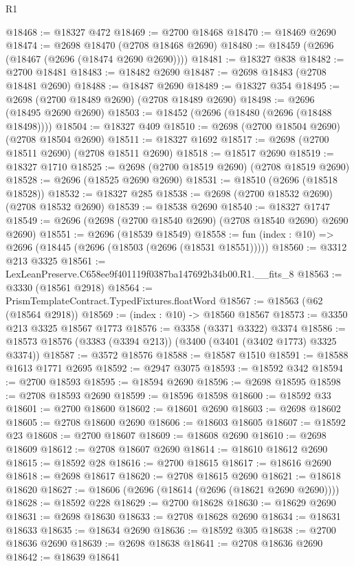 \begin{lexlean}{R1}
\begin{coremodule}
@18468 := @18327 @472
@18469 := @2700 @18468
@18470 := @18469 @2690
@18474 := @2698 @18470 (@2708 @18468 @2690)
@18480 := @18459 (@2696 (@18467 (@2696 (@18474 @2690 @2690))))
@18481 := @18327 @838
@18482 := @2700 @18481
@18483 := @18482 @2690
@18487 := @2698 @18483 (@2708 @18481 @2690)
@18488 := @18487 @2690
@18489 := @18327 @354
@18495 := @2698 (@2700 @18489 @2690) (@2708 @18489 @2690)
@18498 := @2696 (@18495 @2690 @2690)
@18503 := @18452 (@2696 (@18480 (@2696 (@18488 @18498))))
@18504 := @18327 @409
@18510 := @2698 (@2700 @18504 @2690) (@2708 @18504 @2690)
@18511 := @18327 @1692
@18517 := @2698 (@2700 @18511 @2690) (@2708 @18511 @2690)
@18518 := @18517 @2690
@18519 := @18327 @1710
@18525 := @2698 (@2700 @18519 @2690) (@2708 @18519 @2690)
@18528 := @2696 (@18525 @2690 @2690)
@18531 := @18510 (@2696 (@18518 @18528))
@18532 := @18327 @285
@18538 := @2698 (@2700 @18532 @2690) (@2708 @18532 @2690)
@18539 := @18538 @2690
@18540 := @18327 @1747
@18549 := @2696 (@2698 (@2700 @18540 @2690) (@2708 @18540 @2690) @2690 @2690)
@18551 := @2696 (@18539 @18549)
@18558 := fun (index : @10) => @2696 (@18445 (@2696 (@18503 (@2696 (@18531 @18551)))))
@18560 := @3312 @213 @3325
@18561 := LexLeanPreserve.C658ee9f401119f0387ba147692b34b00.R1.__fits_8
@18563 := @3330 (@18561 @2918)
@18564 := PrismTemplateContract.TypedFixtures.floatWord
@18567 := @18563 (@62 (@18564 @2918))
@18569 := (index : @10) -> @18560 @18567
@18573 := @3350 @213 @3325 @18567 @1773
@18576 := @3358 (@3371 @3322) @3374
@18586 := @18573 @18576 (@3383 (@3394 @213)) (@3400 (@3401 (@3402 @1773) @3325 @3374))
@18587 := @3572 @18576
@18588 := @18587 @1510
@18591 := @18588 @1613 @1771 @2695
@18592 := @2947 @3075
@18593 := @18592 @342
@18594 := @2700 @18593
@18595 := @18594 @2690
@18596 := @2698 @18595
@18598 := @2708 @18593 @2690
@18599 := @18596 @18598
@18600 := @18592 @33
@18601 := @2700 @18600
@18602 := @18601 @2690
@18603 := @2698 @18602
@18605 := @2708 @18600 @2690
@18606 := @18603 @18605
@18607 := @18592 @23
@18608 := @2700 @18607
@18609 := @18608 @2690
@18610 := @2698 @18609
@18612 := @2708 @18607 @2690
@18614 := @18610 @18612 @2690
@18615 := @18592 @28
@18616 := @2700 @18615
@18617 := @18616 @2690
@18618 := @2698 @18617
@18620 := @2708 @18615 @2690
@18621 := @18618 @18620
@18627 := @18606 (@2696 (@18614 (@2696 (@18621 @2690 @2690))))
@18628 := @18592 @228
@18629 := @2700 @18628
@18630 := @18629 @2690
@18631 := @2698 @18630
@18633 := @2708 @18628 @2690
@18634 := @18631 @18633
@18635 := @18634 @2690
@18636 := @18592 @305
@18638 := @2700 @18636 @2690
@18639 := @2698 @18638
@18641 := @2708 @18636 @2690
@18642 := @18639 @18641

\end{coremodule}
\end{lexlean}
